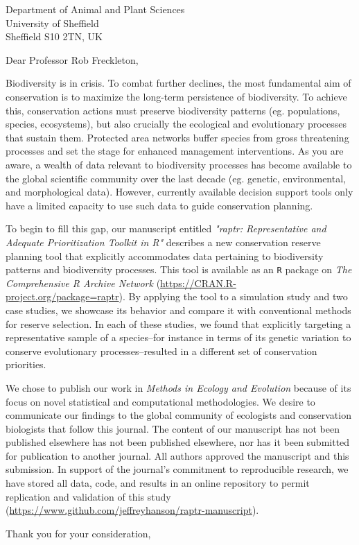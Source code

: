 \documentclass{letter}
\begin{document}
\begin{letter}{Department of Animal and Plant Sciences\\University of Sheffield\\Sheffield S10 2TN, UK}
\opening{Dear Professor Rob Freckleton,}

Biodiversity is in crisis. To combat further declines, the most fundamental aim of conservation is to maximize the long-term persistence of biodiversity. To achieve this, conservation actions must preserve biodiversity patterns (eg. populations, species, ecosystems), but also crucially the ecological and evolutionary processes that sustain them. Protected area networks buffer species from gross threatening processes and set the stage for enhanced management interventions. As you are aware, a wealth of data relevant to biodiversity processes has become available to the global scientific community over the last decade (eg. genetic, environmental, and morphological data). However, currently available decision support tools only have a limited capacity to use such data to guide conservation planning.

To begin to fill this gap, our manuscript entitled \textit{"raptr: Representative and Adequate Prioritization Toolkit in R"} describes a new conservation reserve planning tool that explicitly accommodates data pertaining to biodiversity patterns and biodiversity processes. This tool is available as an \texttt{R} package on \textit{The Comprehensive R Archive Network} (\url{https://CRAN.R-project.org/package=raptr}). By applying the tool to a simulation study and two case studies, we showcase its behavior and compare it with conventional methods for reserve selection. In each of these studies, we found that explicitly targeting a representative sample of a species--for instance in terms of its genetic variation to conserve evolutionary processes--resulted in a different set of conservation priorities.

We chose to publish our work in \textit{Methods in Ecology and Evolution} because of its focus on novel statistical and computational methodologies. We desire to communicate our findings to the global community of ecologists and conservation biologists that follow this journal. The content of our manuscript has not been published elsewhere has not been published elsewhere, nor has it been submitted for publication to another journal. All authors approved the manuscript and this submission. In support of the journal's commitment to reproducible research, we have stored all data, code, and results in an online repository to permit replication and validation of this study (\url{https://www.github.com/jeffreyhanson/raptr-manuscript}). 

\closing{Thank you for your consideration,}

\end{letter}
\end{document}
